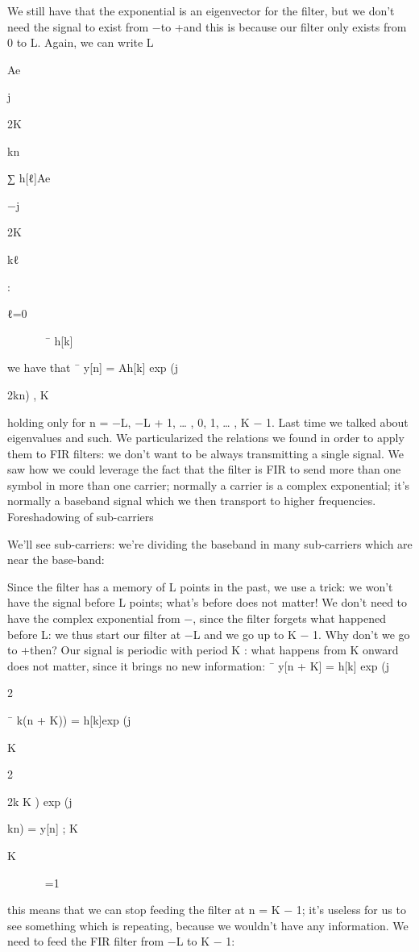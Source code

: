 {We still have that the exponential is an eigenvector for the filter, but we don't need the signal to exist from −\infty to +\infty and this is because our filter only exists from 0 to L.
Again, we can write L

Ae

j

2\pi K

kn

∑ h[ℓ]Ae

−j

2\pi K

kℓ

:

ℓ=0






¯
h[k]

we have that
¯
y[n] = Ah[k] exp (j

2\pi kn) ,
K

holding only for n = −L, −L + 1, … , 0, 1, … , K − 1.
Last time we talked about eigenvalues and such.
We particularized the relations we found in order to apply them to FIR filters: we don't want to be always transmitting a single signal.
We saw how we could leverage the fact that the filter is FIR to send more than one symbol in more than one carrier; normally a carrier is a complex exponential; it's normally a baseband signal which we then transport to higher frequencies.
Foreshadowing of sub-carriers

We'll see sub-carriers: we're dividing the baseband in many sub-carriers which are near the base-band:

Since the filter has a memory of L points in the past, we use a trick: we won't have the signal before L points; what's before does not matter! We don't need to have the complex exponential from −\infty, since the filter forgets what happened before L: we thus start our filter at −L and we go up to K − 1.
Why don't we go to +\infty then? Our signal is periodic with period K : what happens from K onward does not matter, since it brings no new information:
¯
y[n + K] = h[k] exp (j

2\pi

¯
k(n + K)) = h[k]exp (j

K

2\pi

2\pi k K ) exp (j

kn) = y[n] ;
K

K






=1

this means that we can stop feeding the filter at n = K − 1; it's useless for us to see something which is repeating, because we wouldn't have any information.
We need to feed the FIR filter from −L to K − 1:

}

